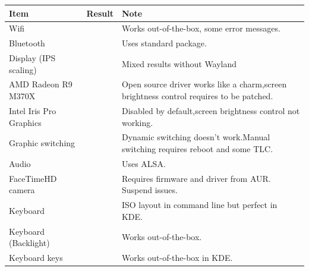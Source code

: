 \begin{center}
	{
	\def\arraystretch{1.2}
	\setlength\arrayrulewidth{1pt}
	\begin{tabularx}{\textwidth}{lcX}
		\rowcolor{white!50}
		\textbf{Item} & \textbf{Result} & \textbf{Note}\\
		\hline\hline
		Wifi\footnotemark[1] & \raisebox{-0.2\height}{\color{green}{\openiconic[]}} & Works out-of-the-box, some error messages.\\
		Bluetooth & \raisebox{-0.2\height}{\color{green}{\openiconic[]}} & Uses standard \code{bluez} package.\\
		Display (IPS scaling)\footnotemark[2] & \raisebox{-0.2\height}{\color{orange}{\openiconic[]}} & Mixed results without Wayland\\
		AMD Radeon R9 M370X & \raisebox{-0.2\height}{\color{blue}{\openiconic[]}} & Open source driver works like a charm,\newline screen brightness control requires \code{apple-gmux} to be patched\footnotemark[3].\\
		Intel Iris Pro Graphics\footnotemark[4] & \raisebox{-0.2\height}{\color{orange}{\openiconic[]}} & Disabled by default,\newline screen brightness control not working.\\
		Graphic switching & \raisebox{-0.2\height}{\color{orange}{\openiconic[]}} & Dynamic switching doesn't work.\newline Manual switching requires reboot and some TLC\footnotemark[5].\\
		Audio & \raisebox{-0.2\height}{\color{green}{\openiconic[]}} & Uses ALSA.\\
		FaceTimeHD camera\footnotemark[6] & \raisebox{-0.2\height}{\color{orange}{\openiconic[]}} & Requires firmware and driver from AUR. Suspend issues.\\
		Keyboard & \raisebox{-0.2\height}{\color{green}{\openiconic[]}} & ISO layout in command line but perfect in KDE.\\
		Keyboard (Backlight) & \raisebox{-0.2\height}{\color{green}{\openiconic[]}} & Works out-of-the-box.\\
		Keyboard \key{Fn} keys & \raisebox{-0.2\height}{\color{green}{\openiconic[]}} & Works out-of-the-box in KDE.
	\end{tabularx}
	}
\end{center}


